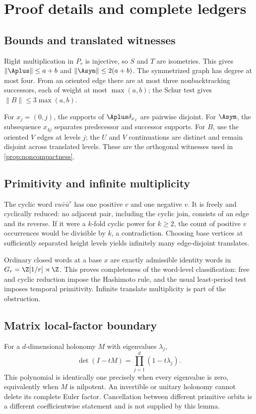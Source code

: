 \section{Proof details and complete ledgers}
\label{app:proofs}

\subsection{Bounds and translated witnesses}

Right multiplication in $P_r$ is injective, so $S$ and $T$ are isometries.
This gives $\|\Aplus\|\le a+b$ and
$\|\Asym\|\le2(a+b)$.  The symmetrized graph has degree at most four.  From
an oriented edge there are at most three nonbacktracking successors, each of
weight at most $\max(a,b)$; the Schur test gives
$\|B\|\le3\max(a,b)$.

For $x_j=(0,j)$, the supports of $\Aplus\delta_{x_j}$ are pairwise disjoint.
For $\Asym$, the subsequence $x_{4j}$ separates predecessor and successor
supports.  For $B$, use the oriented $V$ edges at levels $j$; the $U$ and $V$
continuations are distinct and remain disjoint across translated levels.
These are the orthogonal witnesses used in
\cref{prop:noncompactness}.

\subsection{Primitivity and infinite multiplicity}

The cyclic word $v u\bar v\bar u^r$ has one positive $v$ and one negative
$v$.  It is freely and cyclically reduced: no adjacent pair, including the
cyclic join, consists of an edge and its reverse.  If it were a $k$-fold
cyclic power for $k\ge2$, the count of positive $v$ occurrences would be
divisible by $k$, a contradiction.  Choosing base vertices at sufficiently
separated height levels yields infinitely many edge-disjoint translates.

Ordinary closed words at a base $x$ are exactly admissible identity words in
$G_r=\Z[1/r]\rtimes\Z$.  This proves completeness of the word-level
classification: free and cyclic reduction impose the Hashimoto rule, and
the usual least-period test imposes temporal primitivity.  Infinite
translate multiplicity is part of the obstruction.

\subsection{Matrix local-factor boundary}

For a $d$-dimensional holonomy $M$ with eigenvalues $\lambda_j$,
\[
\det(I-tM)=\prod_{j=1}^d(1-t\lambda_j).
\]
This polynomial is identically one precisely when every eigenvalue is zero,
equivalently when $M$ is nilpotent.  An invertible or unitary holonomy cannot
delete its complete Euler factor.  Cancellation between different primitive
orbits is a different coefficientwise statement and is not supplied by this
lemma.
